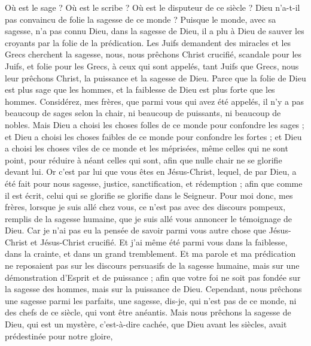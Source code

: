 \begin{multicols}{2}
Où est le sage ? Où est le scribe ? Où est le disputeur de ce siècle ? Dieu n'a-t-il pas convaincu de folie la sagesse de ce monde ?
Puisque le monde, avec sa sagesse, n’a pas connu Dieu, dans la sagesse de Dieu, il a plu à Dieu de sauver les croyants par la folie de la prédication.
Les Juifs demandent des miracles et les Grecs cherchent la sagesse,
nous, nous prêchons Christ crucifié, scandale pour les Juifs, et folie pour les Grecs,
à ceux qui sont appelés, tant Juifs que Grecs, nous leur prêchons Christ, la puissance et la sagesse de Dieu.
Parce que la folie de Dieu est plus sage que les hommes, et la faiblesse de Dieu est plus forte que les hommes.
Considérez, mes frères, que parmi vous qui avez été appelés, il n’y a pas beaucoup de sages selon la chair, ni beaucoup de puissants, ni beaucoup de nobles.
Mais Dieu a choisi les choses folles de ce monde pour confondre les sages ; et Dieu a choisi les choses faibles de ce monde pour confondre les fortes ;
et Dieu a choisi les choses viles de ce monde et les méprisées, même celles qui ne sont point, pour réduire à néant celles qui sont,
afin que nulle chair ne se glorifie devant lui.
Or c'est par lui que vous êtes en Jésus-Christ, lequel, de par Dieu, a été fait pour nous sagesse, justice, sanctification, et rédemption ;
afin que comme il est écrit, celui qui se glorifie se glorifie dans le Seigneur.
\VerseOne{}Pour moi donc, mes frères, lorsque je suis allé chez vous, ce n’est pas avec des discours pompeux, remplis de la sagesse humaine, que je suis allé vous annoncer le témoignage de Dieu.
Car je n’ai pas eu la pensée de savoir parmi vous autre chose que Jésus-Christ et Jésus-Christ crucifié.
Et j'ai même été parmi vous dans la faiblesse, dans la crainte, et dans un grand tremblement.
Et ma parole et ma prédication ne reposaient pas sur les discours persuasifs de la sagesse humaine, mais sur une démonstration d'Esprit et de puissance ;
afin que votre foi ne soit pas fondée sur la sagesse des hommes, mais sur la puissance de Dieu.
Cependant, nous prêchons une sagesse parmi les parfaits, une sagesse, dis-je, qui n'est pas de ce monde, ni des chefs de ce siècle, qui vont être anéantis.
Mais nous prêchons la sagesse de Dieu, qui est un mystère, c'est-à-dire cachée, que Dieu avant les siècles, avait prédestinée pour notre gloire,

\end{multicols}
